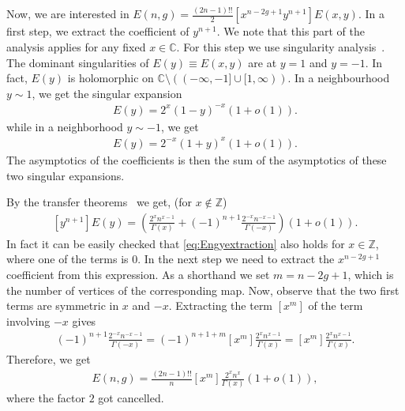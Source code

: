 \documentclass[a4paper,12pt]{article}
\theoremstyle{definition}
\newcommand{\Landauo}{o}
\begin{document}
Now, we are interested in $E(n,g) = \frac{(2n-1)!!}{2} [x^{n-2g+1} y^{n+1}] E(x,y)$. 
In a first step, we extract the coefficient of $y^{n+1}$. We note that this part of the analysis applies for any fixed $x\in\mathbb{C}$.
For this step we use singularity analysis~\cite{flajolet}.
The dominant singularities of $E(y) \equiv E(x,y)$ are at $y=1$ and $y=-1$. In fact, $E(y)$ is holomorphic on $\mathbb{C}\setminus\left((-\infty,-1]\cup[1,\infty)\right)$.
In a neighbourhood $y \sim 1$, we get the singular expansion
\begin{align*}
    E(y) = 2^x (1-y)^{-x}\left(1 + \Landauo(1)\right).
\end{align*}
while in a neighborhood $y \sim -1$, we get
\begin{align*}
    E(y) = 2^{-x} (1+y)^{x}\left(1 + \Landauo(1)\right).
\end{align*}
The asymptotics of the coefficients is then the sum of the asymptotics of these two singular expansions. 

By the transfer theorems~\cite{flajolet} we get, (for $x\notin\mathbb{Z}$)
\begin{align}
    \label{eq:Engyextraction}
    [y^{n+1}] E(y) = \left(\frac{2^x n^{x-1}}{\Gamma(x)} + (-1)^{n+1}\frac{2^{-x} n^{-x-1}}{\Gamma(-x)}\right)\left(1 + \Landauo(1)\right).
\end{align}
In fact it can be easily checked that \eqref{eq:Engyextraction} also holds for $x\in\mathbb{Z}$, where one of the terms is $0$.
In the next step we need to extract the $x^{n-2g+1}$ coefficient from this expression. 
As a shorthand we set $m=n-2g+1$, which is the number of vertices of the corresponding map. 
Now, observe that the two first terms are symmetric in $x$ and $-x$. 
Extracting the term $[x^m]$ of the term involving $-x$ gives
\begin{align*}
    [x^m](-1)^{n+1}\frac{2^{-x} n^{-x-1}}{\Gamma(-x)} = (-1)^{n+1+m}[x^m]\frac{2^{x} n^{x-1}}{\Gamma(x)} = [x^m] \frac{2^x n^{x-1}}{\Gamma(x)}.
\end{align*}
Therefore, we get
\begin{align}
    \label{eq:labelEngBeforeSP}
    E(n,g) = \frac{(2n-1)!!}{n} [x^m] \frac{2^x n^{x}}{\Gamma(x)}\left(1 + \Landauo(1)\right),
\end{align}
where the factor $2$ got cancelled.
\end{document}
